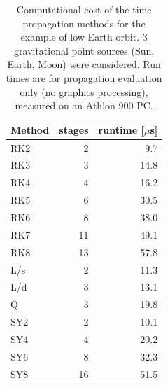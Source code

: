 \documentclass[a4paper]{article}
\begin{document}
\begin{table}\centering
\begin{tabular}{l|rr}
Method & stages & runtime [$\mu$s] \\ \hline
RK2 & 2 & 9.7 \\
RK3 & 3 & 14.8 \\
RK4 & 4 & 16.2 \\
RK5 & 6 & 30.5 \\
RK6 & 8 & 38.0 \\
RK7 & 11 & 49.1 \\
RK8 & 13 & 57.8 \\ \hline
L/s & 2 & 11.3 \\
L/d & 3 & 13.1 \\
Q & 3 & 19.8 \\ \hline
SY2 & 2 & 10.1 \\
SY4 & 4 & 20.2 \\
SY6 & 8 & 32.3 \\
SY8 & 16 & 51.5
\end{tabular}
\caption{Computational cost of the time propagation methods for the example of low Earth orbit. 3 gravitational point sources (Sun, Earth, Moon) were considered. Run times are for propagation evaluation only (no graphics processing), measured on an Athlon 900 PC.}
\end{table}
\end{document}
